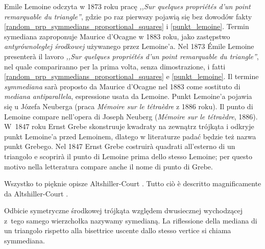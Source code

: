
%


Emile Lemoine odczyta w 1873 roku pracę \emph{,,Sur quelques propriétés d'un point remarquable du triangle''}, gdzie po raz pierwszy pojawią się bez dowodów fakty \ref{random_prp_symmedians_proportional_squares} i \ref{punkt_lemoine}. %
Termin symediana zaproponuje Maurice d'Ocagne w 1883 roku, jako zastępstwo \emph{antyrównoległej środkowej} używanego przez Lemoine'a. %
Nel 1873 Émile Lemoine presenterà il lavoro \emph{,,Sur quelques propriétés d'un point remarquable du triangle''}, nel quale compariranno per la prima volta, senza dimostrazione, i fatti \ref{random_prp_symmedians_proportional_squares} e \ref{punkt_lemoine}. %
Il termine \emph{symmediana} sarà proposto da Maurice d'Ocagne nel 1883 come sostituto di \emph{mediana antiparallela}, espressione usata da Lemoine. %
Punkt Lemoine'a pojawia się u Józefa Neuberga (praca \emph{Mémoire sur le tétraèdre} z 1886 roku). %
Il punto di Lemoine compare nell'opera di Joseph Neuberg (\emph{Mémoire sur le tétraèdre}, 1886). %
W~1847 roku Ernst Grebe skonstruuje kwadraty na zewnątrz trójkąta i odkryje punkt Lemoine'a przed Lemoinem, dlatego w literaturze padać będzie też nazwa punkt Grebego. %
Nel 1847 Ernst Grebe costruirà quadrati all'esterno di un triangolo e scoprirà il punto di Lemoine prima dello stesso Lemoine; per questo motivo nella letteratura compare anche il nome di punto di Grebe. %

Wszystko to pięknie opisze Altshiller-Court \cite{altshiller_2007}. %
Tutto ciò è descritto magnificamente da Altshiller-Court \cite{altshiller_2007}. %



\begin{definition}
[symediana] %
[symmediana] %
    Odbicie symetryczne środkowej trójkąta względem dwusiecznej wychodzącej z~tego samego wierzchołka nazywamy symedianą. %
    La riflessione della mediana di un triangolo rispetto alla bisettrice uscente dallo stesso vertice si chiama symmediana. %
\end{definition}

